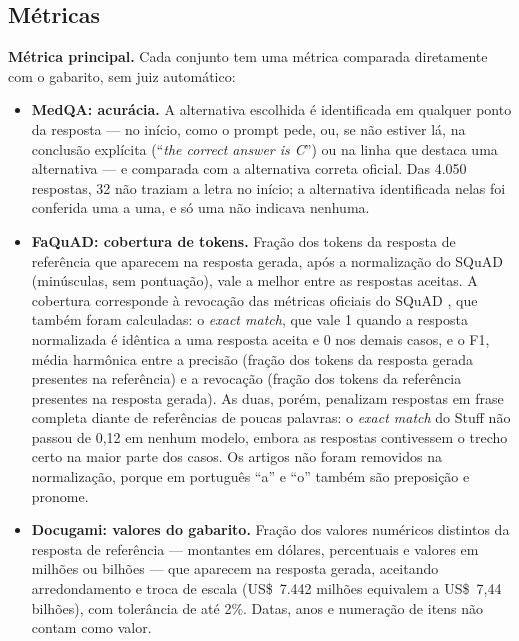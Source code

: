\subsection{Métricas}
\label{ssc:metricas}

\textbf{Métrica principal.} Cada conjunto tem uma métrica comparada diretamente com o gabarito, sem juiz automático:

\begin{itemize}
  \item \textbf{MedQA: acurácia.} A alternativa escolhida é identificada em qualquer ponto da resposta --- no início, como o prompt pede, ou, se não estiver lá, na conclusão explícita (``\emph{the correct answer is C}'') ou na linha que destaca uma alternativa --- e comparada com a alternativa correta oficial. Das 4.050 respostas, 32 não traziam a letra no início; a alternativa identificada nelas foi conferida uma a uma, e só uma não indicava nenhuma.
  \item \textbf{FaQuAD: cobertura de tokens.} Fração dos tokens da resposta de referência que aparecem na resposta gerada, após a normalização do SQuAD (minúsculas, sem pontuação), vale a melhor entre as respostas aceitas. A cobertura corresponde à revocação das métricas oficiais do SQuAD \cite{rajpurkar2016squad}, que também foram calculadas: o \emph{exact match}, que vale 1 quando a resposta normalizada é idêntica a uma resposta aceita e 0 nos demais casos, e o F1, média harmônica entre a precisão (fração dos tokens da resposta gerada presentes na referência) e a revocação (fração dos tokens da referência presentes na resposta gerada). As duas, porém, penalizam respostas em frase completa diante de referências de poucas palavras: o \emph{exact match} do Stuff não passou de 0,12 em nenhum modelo, embora as respostas contivessem o trecho certo na maior parte dos casos. Os artigos não foram removidos na normalização, porque em português ``a'' e ``o'' também são preposição e pronome.
  \item \textbf{Docugami: valores do gabarito.} Fração dos valores numéricos distintos da resposta de referência --- montantes em dólares, percentuais e valores em milhões ou bilhões --- que aparecem na resposta gerada, aceitando arredondamento e troca de escala (US\$~7.442 milhões equivalem a US\$~7,44 bilhões), com tolerância de até 2\%. Datas, anos e numeração de itens não contam como valor.
\end{itemize}

